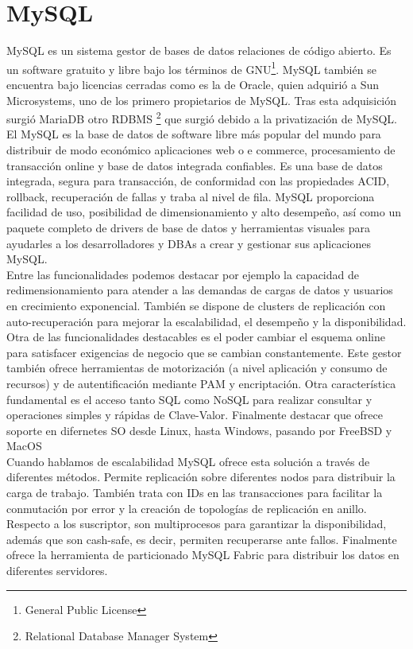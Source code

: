 \documentclass{article}
\begin{document}
\section{MySQL}
MySQL es un sistema gestor de bases de datos relaciones de código abierto. 
Es un software gratuito y libre bajo los términos de GNU\footnote{General Public License}. MySQL también se encuentra bajo licencias cerradas como es la de Oracle, quien adquirió a Sun Microsystems, uno de los primero propietarios de MySQL. Tras esta adquisición surgió MariaDB otro RDBMS \footnote{Relational Database Manager System} que surgió debido a la privatización de MySQL.\\

El MySQL es la base de datos de software libre más popular del mundo para distribuir de modo económico aplicaciones web o e\- commerce, procesamiento de transacción online y base de datos integrada confiables.  Es una base de datos integrada, segura para transacción, de conformidad con las propiedades ACID, rollback, recuperación de fallas y traba al nivel de fila. MySQL proporciona facilidad de uso, posibilidad de dimensionamiento y alto desempeño, así como un paquete completo de drivers de base de datos y herramientas visuales para ayudarles a los desarrolladores y DBAs a crear y gestionar sus aplicaciones MySQL. \\

Entre las funcionalidades podemos destacar por ejemplo la capacidad de redimensionamiento para atender a las demandas de cargas de datos y usuarios en crecimiento exponencial. También se dispone de clusters de replicación con auto-recuperación para mejorar la escalabilidad, el desempeño y la disponibilidad.\\
Otra de las funcionalidades destacables es el poder cambiar el esquema online para satisfacer exigencias de negocio que se cambian constantemente. Este gestor también ofrece herramientas de motorización (a nivel aplicación y consumo de recursos) y de autentificación mediante PAM y encriptación.
Otra característica fundamental es el acceso tanto SQL como NoSQL para realizar consultar y operaciones simples y rápidas de Clave-Valor. Finalmente destacar que ofrece soporte en difernetes SO desde Linux, hasta Windows, pasando por FreeBSD y MacOS\\

Cuando hablamos de escalabilidad MySQL ofrece esta solución a través de diferentes métodos. Permite replicación sobre diferentes nodos para distribuir la carga de trabajo. También trata con IDs en las transacciones para facilitar la conmutación por error y la creación de topologías de replicación en anillo. Respecto a los suscriptor, son multiprocesos para garantizar la disponibilidad, además que son cash-safe, es decir, permiten recuperarse ante fallos. Finalmente ofrece la herramienta de particionado MySQL Fabric para distribuir los datos en diferentes servidores.\cite{lock}\\
\end{document}
